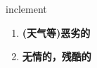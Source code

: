 
\begin{frame}
{\huge inclement}
\begin{center}
\begin{enumerate}\Large
  \item \textbf{(天气等)恶劣的}
  \item \textbf{无情的，残酷的}
\end{enumerate}
\end{center}
\end{frame}
